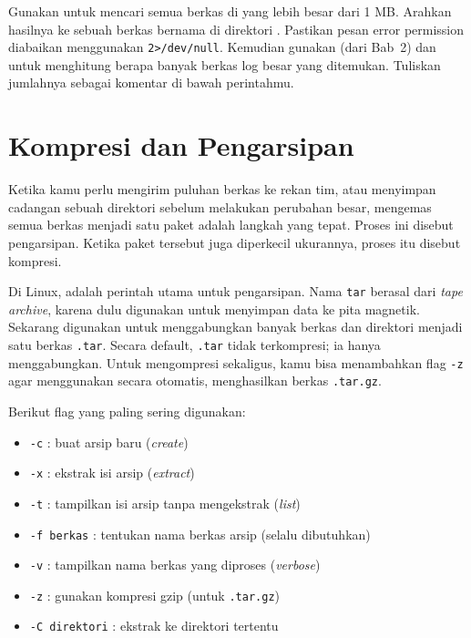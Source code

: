 \begin{challengebox}
Gunakan  untuk mencari semua berkas  di  yang lebih
besar dari 1 MB. Arahkan hasilnya ke sebuah berkas bernama 
di direktori . Pastikan pesan error permission diabaikan
menggunakan \texttt{2>/dev/null}. Kemudian gunakan  (dari Bab~2) dan 
untuk menghitung berapa banyak berkas log besar yang ditemukan. Tuliskan jumlahnya sebagai
komentar di bawah perintahmu.
\end{challengebox}

\section{Kompresi dan Pengarsipan}
\label{sec:archive}

Ketika kamu perlu mengirim puluhan berkas ke rekan tim, atau menyimpan cadangan sebuah
direktori sebelum melakukan perubahan besar, mengemas semua berkas menjadi satu paket
adalah langkah yang tepat. Proses ini disebut pengarsipan. Ketika paket tersebut juga
diperkecil ukurannya, proses itu disebut kompresi.

Di Linux,  adalah perintah utama untuk pengarsipan. Nama \texttt{tar} berasal
dari \textit{tape archive}, karena dulu digunakan untuk menyimpan data ke pita magnetik.
Sekarang  digunakan untuk menggabungkan banyak berkas dan direktori menjadi satu
berkas \texttt{.tar}. Secara default, \texttt{.tar} tidak terkompresi; ia hanya
menggabungkan. Untuk mengompresi sekaligus, kamu bisa menambahkan flag \texttt{-z}
agar  menggunakan  secara otomatis, menghasilkan berkas \texttt{.tar.gz}.

Berikut flag  yang paling sering digunakan:

\begin{itemize}
    \item \texttt{-c} : buat arsip baru (\textit{create})
    \item \texttt{-x} : ekstrak isi arsip (\textit{extract})
    \item \texttt{-t} : tampilkan isi arsip tanpa mengekstrak (\textit{list})
    \item \texttt{-f berkas} : tentukan nama berkas arsip (selalu dibutuhkan)
    \item \texttt{-v} : tampilkan nama berkas yang diproses (\textit{verbose})
    \item \texttt{-z} : gunakan kompresi gzip (untuk \texttt{.tar.gz})
    \item \texttt{-C direktori} : ekstrak ke direktori tertentu
\end{itemize}

